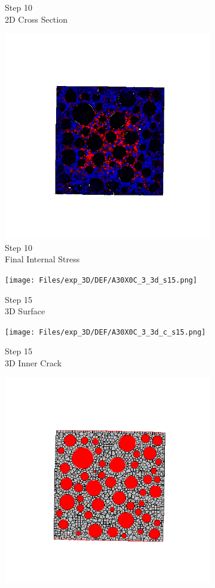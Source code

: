 \begin{figure}[ht!]
\begin{subfigure}{.25\textwidth}
      \caption{Step 10\\2D Cross Section}
    \end{subfigure}%
    \begin{subfigure}{.25\textwidth}
      \centering
      \includegraphics[width=.8\linewidth]{Files/exp_3D/DEF/A30X0C_3_s10.png}
      \caption{Step 10\\Final Internal Stress}
    \end{subfigure}
    \begin{subfigure}{.25\textwidth}
      \centering
      \texttt{[image: Files/exp\_3D/DEF/A30X0C\_3\_3d\_s15.png]}
      \caption{Step 15\\3D Surface}
    \end{subfigure}%
    \begin{subfigure}{.25\textwidth}
      \centering
      \texttt{[image: Files/exp\_3D/DEF/A30X0C\_3\_3d\_c\_s15.png]}
      \caption{Step 15\\3D Inner Crack}
    \end{subfigure}%
    \begin{subfigure}{.25\textwidth}
      \centering
      \includegraphics[width=.8\linewidth]{Files/exp_3D/DEF/A30X0C_3_c15.png}

\end{subfigure}
\end{figure}
